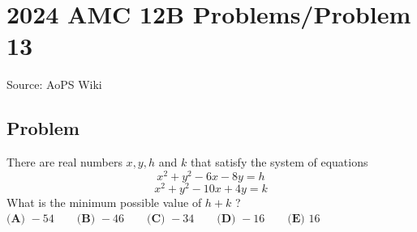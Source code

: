 \documentclass[12pt]{article}
\begin{document}
\section*{{2024 AMC 12B Problems/Problem 13}}
Source: AoPS Wiki

\subsection*{Problem}
There are real numbers $x,y,h$ and $k$ that satisfy the system of equations \[x^2 + y^2 - 6x - 8y = h\] \[x^2 + y^2 - 10x + 4y = k\] What is the minimum possible value of $h+k$ ? $\textbf{(A) }-54 \qquad \textbf{(B) }-46 \qquad \textbf{(C) }-34 \qquad \textbf{(D) }-16 \qquad \textbf{(E) }16 \qquad$
\end{document}
